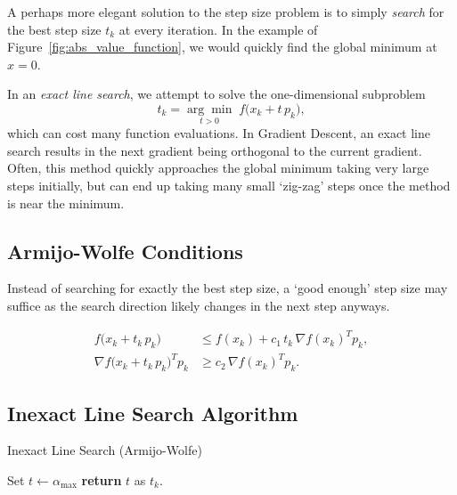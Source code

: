\documentclass{article}
\begin{document}
A perhaps more elegant solution to the step size problem
is to simply \emph{search} for the best step size $t_k$
at every iteration.
In the example of Figure~\ref{fig:abs_value_function},
we would quickly find the global minimum at $x = 0$.





In an \emph{exact line search}, we attempt to solve the one-dimensional
subproblem
\begin{equation}
    t_k = \underset{t > 0}{\arg\min} \; f\bigl(x_k + t\, p_k\bigr),
\end{equation}
which can cost many function evaluations.
In Gradient Descent, an exact line search results in the
next gradient being orthogonal to the current gradient.
Often, this method quickly approaches the global minimum
taking very large steps initially, but can end up
taking many small
`zig-zag' steps once the method is near the minimum.

\subsection{Armijo-Wolfe Conditions}
Instead of searching for exactly the best step size, a `good enough'
step size may suffice as the search direction likely changes in
the next step anyways.

\begin{align}
    f\bigl(x_k + t_k\,p_k\bigr)              & \le f(x_k)
    + c_1\, t_k \,\nabla f(x_k)^T p_k, \tag{Armijo}                                       \\[6pt]
    \nabla f\bigl(x_k + t_k\,p_k\bigr)^T p_k & \ge c_2 \,\nabla f(x_k)^T p_k. \tag{Wolfe}
\end{align}

\subsection{Inexact Line Search Algorithm}
\begin{algorithm}[H]
    \caption{Inexact Line Search (Armijo-Wolfe)}
    \SetAlgoLined {}  Set $t \gets \alpha_{\text{max}}$ \;  \textbf{return} $t$ as $t_k$.
\end{algorithm}
\end{document}
